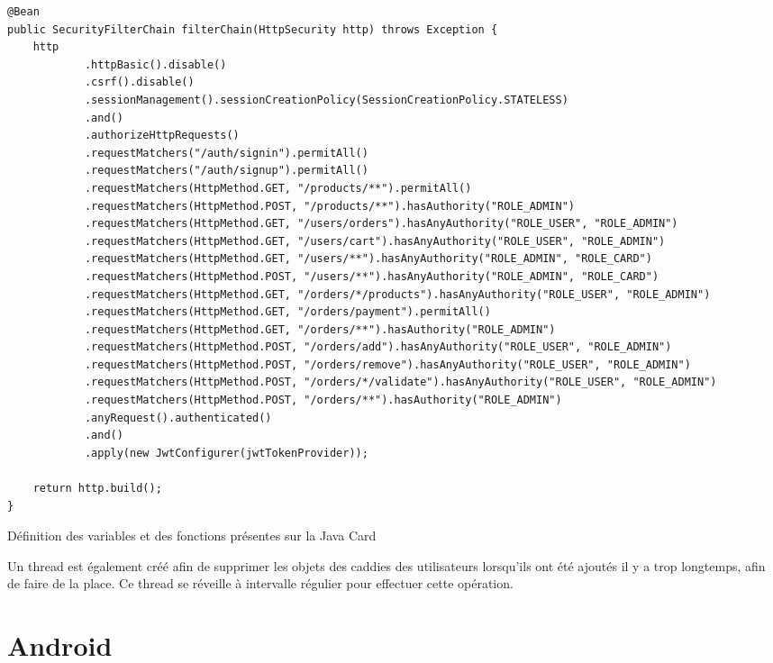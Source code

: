 \begin{listing}[H]
    \begin{verbatim}
@Bean
public SecurityFilterChain filterChain(HttpSecurity http) throws Exception {
    http
            .httpBasic().disable()
            .csrf().disable()
            .sessionManagement().sessionCreationPolicy(SessionCreationPolicy.STATELESS)
            .and()
            .authorizeHttpRequests()
            .requestMatchers("/auth/signin").permitAll()
            .requestMatchers("/auth/signup").permitAll()
            .requestMatchers(HttpMethod.GET, "/products/**").permitAll()
            .requestMatchers(HttpMethod.POST, "/products/**").hasAuthority("ROLE_ADMIN")
            .requestMatchers(HttpMethod.GET, "/users/orders").hasAnyAuthority("ROLE_USER", "ROLE_ADMIN")
            .requestMatchers(HttpMethod.GET, "/users/cart").hasAnyAuthority("ROLE_USER", "ROLE_ADMIN")
            .requestMatchers(HttpMethod.GET, "/users/**").hasAnyAuthority("ROLE_ADMIN", "ROLE_CARD")
            .requestMatchers(HttpMethod.POST, "/users/**").hasAnyAuthority("ROLE_ADMIN", "ROLE_CARD")
            .requestMatchers(HttpMethod.GET, "/orders/*/products").hasAnyAuthority("ROLE_USER", "ROLE_ADMIN")
            .requestMatchers(HttpMethod.GET, "/orders/payment").permitAll()
            .requestMatchers(HttpMethod.GET, "/orders/**").hasAuthority("ROLE_ADMIN")
            .requestMatchers(HttpMethod.POST, "/orders/add").hasAnyAuthority("ROLE_USER", "ROLE_ADMIN")
            .requestMatchers(HttpMethod.POST, "/orders/remove").hasAnyAuthority("ROLE_USER", "ROLE_ADMIN")
            .requestMatchers(HttpMethod.POST, "/orders/*/validate").hasAnyAuthority("ROLE_USER", "ROLE_ADMIN")
            .requestMatchers(HttpMethod.POST, "/orders/**").hasAuthority("ROLE_ADMIN")
            .anyRequest().authenticated()
            .and()
            .apply(new JwtConfigurer(jwtTokenProvider));

    return http.build();
}
    \end{verbatim}
    \caption{Définition des variables et des fonctions présentes sur la Java Card}
    \label{listing:joey-filter-chain}
\end{listing}

Un thread est également créé afin de supprimer les objets des caddies des utilisateurs lorsqu'ils ont été
ajoutés il y a trop longtemps, afin de faire de la place. Ce thread se réveille à intervalle régulier pour
effectuer cette opération.

\section{Android}

